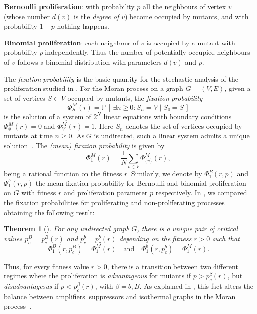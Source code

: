 \documentclass[a4paper,english,10pt]{amsart}
\newtheorem{theorem}{\bf Theorem}[section]
\theoremstyle{definition}
\numberwithin{equation}{section}
\begin{document}
\begin{list}{\itemii}{\leftmargin=14pt}

  \item[i)~] \textbf{Bernoulli proliferation}: with probability $p$ all the 
 neighbours of vertex $v$ (whose number $d(v)$ is the \emph{degree of $v$}) become occupied by mutants, and with probability $1-p$ nothing happens.

  \item[ii)] \textbf{Binomial proliferation}: each neighbour of $v$ is occupied by a mutant with probability $p$ independently. Thus the number of potentially occupied neighbours of $v$ follows a binomial distribution with parameters $d(v)$ and $p$.

\end{list}

The \emph{fixation probability} is the basic quantity for the stochastic analysis of the proliferation studied in \cite{AlcaldeGuerberoffLozano2022}.
For the Moran process on a graph $G = (V,E)$, given a set of vertices $S \subset V$ occupied by mutants, the \emph{fixation  probability}
\[
\Phi^M_S(r)
            = \mathbb{P} \, [ \, \exists n \geq 0 : S_n = V \mid S_0 = S \,]
\]
is the solution of a system of $2^N$ linear equations with boundary conditions 
$\Phi^M_\emptyset(r)=0$ and $\Phi^M_V(r)=1$. Here $S_n$ denotes the set of vertices occupied by mutants at time $n\geq 0$. As $G$ is undirected, such a linear 
system admits a unique solution~\cite{KT:ISM}. 
The \emph{(mean) fixation probability}
is given by 
\[
\Phi^M_1(r) = \frac 1N \sum_{v \in V} \Phi^M_{\{v\}}(r),
\]
being a rational function on the fitness $r$. Similarly, we denote by $\Phi^B_1(r,p)$ and 
$\Phi^b_1(r,p)$ the mean 
fixation probability for Bernoulli and binomial proliferation on 
$G$ with fitness $r$ and proliferation parameter $p$ respectively. In \cite{AlcaldeGuerberoffLozano2022}, we compared the fixation probabilities for proliferating and non-proliferating processes obtaining the following result: 
\begin{theorem}[\cite{AlcaldeGuerberoffLozano2022}]
  \label{thm:critical}
  For any undirected 
  graph $G$, there is a unique pair of 
  critical values $p_c^B = p_c^B(r)$ and $p_c^b = p_c^b(r)$ depending on the 
  fitness $r >0$ such that 
 $$
 \Phi^B_1(r,p_c^B) = \Phi^M_1(r)
\quad \text{and} \quad
\Phi^b_1(r,p_c^b) = \Phi^M_1(r).
$$
\end{theorem}
\noindent
Thus, for every fitness value $r > 0$, there is a transition between two 
different regimes where the proliferation is \emph{advantageous} for mutants if $p > p_c^\beta(r)$, but \emph{disadvantageous} if $p < p_c^\beta(r)$, with $\beta = b,B$. As explained in \cite{AlcaldeGuerberoffLozano2022}, this fact alters the balance between amplifiers, suppressors and isothermal graphs in the Moran 
process~\cite{PLOS,PLOS2018,Allen2020,HindersinTraulsen}.
\end{document}
